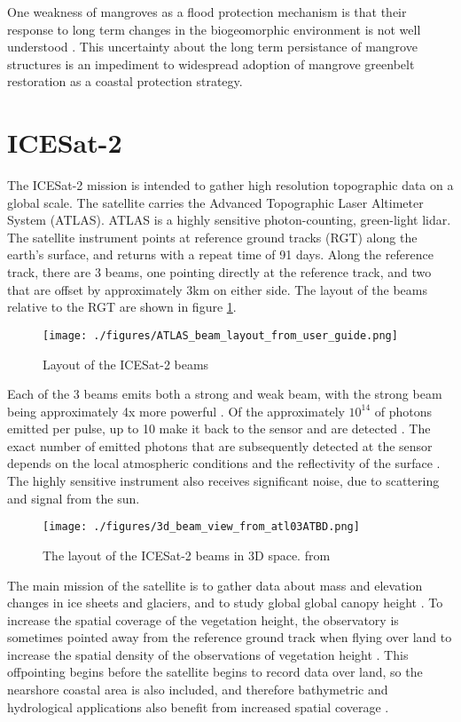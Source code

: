 One weakness of mangroves as a flood protection mechanism is that their response to long term changes in the biogeomorphic environment is not well understood \parencite{Gijsman2021}. This uncertainty about the long term persistance of mangrove structures is an impediment to widespread adoption of mangrove greenbelt restoration as a coastal protection strategy.

\section{ICESat-2}

The ICESat-2 mission is intended to gather high resolution topographic data on a global scale. The satellite carries the Advanced Topographic Laser Altimeter System (ATLAS). ATLAS is a highly sensitive photon-counting, green-light lidar. The satellite instrument points at reference ground tracks (RGT) along the earth's surface, and returns with a repeat time of 91 days. Along the reference track, there are 3 beams, one pointing directly at the reference track, and two that are offset by approximately 3km on either side. The layout of the beams relative to the RGT are shown in figure \ref{fig:icesat-rgts}.

\begin{figure}[h!]
      \centering
      \texttt{[image: ./figures/ATLAS\_beam\_layout\_from\_user\_guide.png]}
      \caption{Layout of the ICESat-2 beams}
      \label{fig:icesat-rgts}
\end{figure}

Each of the 3 beams emits both a strong and weak beam, with the strong beam being approximately 4x more powerful \parencite{Neumann2019d}. Of the approximately \(10^{14}\) of photons emitted per pulse, up to  10 make it back to the sensor and are detected \parencite{Neumann2019d}. The exact number of emitted photons that are subsequently detected at the sensor depends on the local atmospheric conditions and the reflectivity of the surface \parencite{Neumann2019e}. The highly sensitive instrument also receives significant noise, due to scattering and signal from the sun.

\begin{figure}[htbp]
      \centering
      \texttt{[image: ./figures/3d\_beam\_view\_from\_atl03ATBD.png]}
      \caption{The layout of the ICESat-2 beams in 3D space. from \cite{Neumann2019d}}
      \label{3d-beams}
\end{figure}


The main mission of the satellite is to gather data about mass and elevation changes in ice sheets and glaciers, and to study global global canopy height \parencite{Markus2017}. To increase the spatial coverage of the vegetation height, the observatory is sometimes pointed away from the reference ground track when flying over land to increase the spatial density of the observations of vegetation height \parencite{Markus2017}. This offpointing begins before the satellite begins to record data over land, so the nearshore coastal area is also included, and therefore bathymetric and hydrological applications also benefit from increased spatial coverage \parencite{Magruder2021}.

